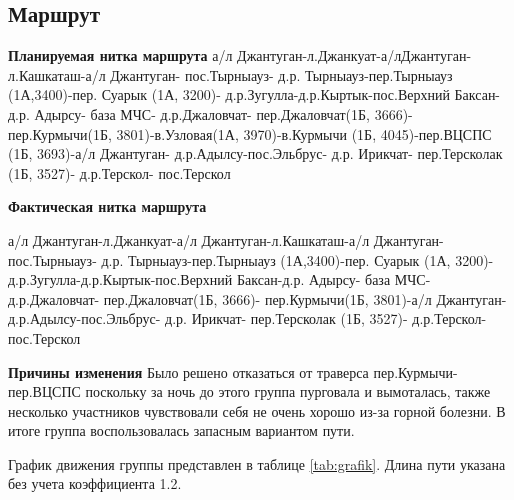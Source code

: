 \documentclass[]{article}
\begin{document}
\subsection{Маршрут}

\textbf{Планируемая нитка маршрута}
а/л Джантуган-л.Джанкуат-а/лДжантуган-л.Кашкаташ-а/л Джантуган- пос.Тырныауз- д.р. Тырныауз-пер.Тырныауз (1А,3400)-пер. Суарык (1А, 3200)- д.р.Зугулла-д.р.Кыртык-пос.Верхний Баксан-д.р. Адырсу- база МЧС- д.р.Джаловчат- пер.Джаловчат(1Б, 3666)- пер.Курмычи(1Б, 3801)-в.Узловая(1А, 3970)-в.Курмычи (1Б, 4045)-пер.ВЦСПС (1Б, 3693)-а/л Джантуган- д.р.Адылсу-пос.Эльбрус- д.р. Ирикчат- пер.Терсколак (1Б, 3527)- д.р.Терскол- пос.Терскол


\textbf{Фактическая нитка маршрута}

а/л Джантуган-л.Джанкуат-а/л Джантуган-л.Кашкаташ-а/л Джантуган- пос.Тырныауз- д.р. Тырныауз-пер.Тырныауз (1А,3400)-пер. Суарык (1А, 3200)- д.р.Зугулла-д.р.Кыртык-пос.Верхний Баксан-д.р. Адырсу- база МЧС- д.р.Джаловчат- пер.Джаловчат(1Б, 3666)- пер.Курмычи(1Б, 3801)-а/л Джантуган- д.р.Адылсу-пос.Эльбрус- д.р. Ирикчат-  пер.Терсколак (1Б, 3527)- д.р.Терскол- пос.Терскол

\textbf{Причины изменения}
Было решено отказаться от траверса пер.Курмычи-пер.ВЦСПС поскольку за ночь до этого группа пурговала и вымоталась, также несколько участников чувствовали себя не очень хорошо из-за горной болезни.
В итоге группа воспользовалась запасным вариантом пути.

График движения группы представлен в таблице \ref{tab:grafik}. Длина пути указана без учета коэффициента 1.2.
\end{document}
